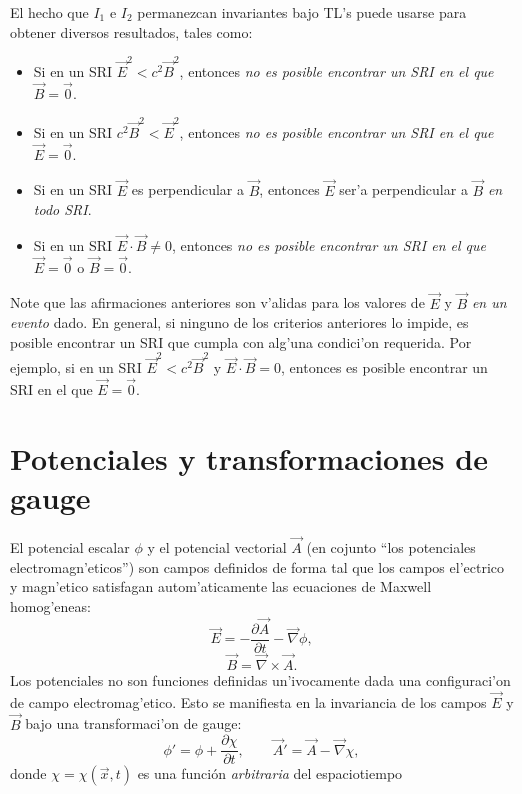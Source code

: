 El hecho que $I_1$ e $I_2$ permanezcan invariantes bajo TL's puede usarse para
obtener diversos resultados, tales como:
\begin{itemize}
\item Si en un SRI $\vec{E}^2<c^2\vec{B}^2$, entonces \textit{no es posible
encontrar un SRI en el que} $\vec{B}=\vec{0}$.
\item Si en un SRI $c^2\vec{B}^2<\vec{E}^2$, entonces \textit{no es posible
encontrar un SRI en el que} $\vec{E}=\vec{0}$.
\item Si en un SRI $\vec{E}$ es perpendicular a $\vec{B}$, entonces $\vec{E}$
ser'a perpendicular a $\vec{B}$ \textit{en todo SRI}.
\item Si en un SRI $\vec{E}\cdot\vec{B}\neq 0$, entonces \textit{no es posible encontrar un SRI en el que} $\vec{E}=\vec{0}$ o $\vec{B}=\vec{0}$.
\end{itemize}
Note que las afirmaciones anteriores son v'alidas para los valores de $\vec{E}$
y $\vec{B}$ \textit{en un evento} dado. En general, si ninguno de los criterios anteriores lo impide, es posible encontrar un SRI que cumpla con alg'una condici'on requerida. Por ejemplo, si en un SRI $\vec{E}^2<c^2\vec{B}^2$ y $\vec{E}\cdot\vec{B}=0$, entonces es posible encontrar un SRI en el que $\vec{E}=\vec{0}$.


\section{Potenciales y transformaciones de gauge}

El potencial escalar $\phi$ y el potencial vectorial $\vec{A}$ (en cojunto ``los potenciales electromagn'eticos'') son campos definidos de forma tal que los campos el'ectrico y magn'etico satisfagan autom'aticamente las ecuaciones de Maxwell homog'eneas: 
\begin{equation}\label{defphi}
\vec{E} =  - \frac{\partial \vec{A}}{\partial t} - \vec{\nabla}\phi ,
\end{equation}
\begin{equation}\label{BrotA}
\vec{B}=\vec{\nabla}\times \vec{A}.
\end{equation}
Los potenciales no son funciones definidas un'ivocamente dada una configuraci'on de campo electromag'etico. Esto se manifiesta en la invariancia de los campos $\vec{E}$ y $\vec{B}$ bajo una transformaci'on de gauge:
\begin{equation}
\phi' =\phi +\frac{\partial \chi}{\partial t}, \qquad
{\vec{A}}' = \vec{A} - \vec{\nabla}{\chi},
\end{equation}
donde $\chi=\chi(\vec{x},t)$ es una funci\'on \textit{arbitraria} del espaciotiempo

